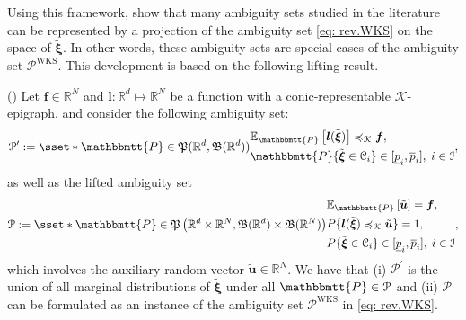 \documentclass[final,onefignum,onetabnum]{class}
\newcommand{\ee}[2]{\mathbb{E}_{#1} \left[ #2 \right]}
\newcommand{\bs}[1]{\boldsymbol{#1}} %
\newcommand{\Bs}[1]{\mathbb{#1}} %
\newcommand{\Ts}[1]{\mathbbmtt{#1}} %
\newcommand{\Cs}[1]{\mathcal{#1}} %
\newcommand{\Fs}[1]{\mathfrak{#1}} %
\newcommand{\txi}{\tilde{\bs{\xi}}}
\newcommand{\tbs}[1]{\tilde{\bs{#1}}}
\newcommand{\ul}[1]{\underline{#1}}
\newcommand{\ol}[1]{\overline{#1}}
\newcommand{\pprobset}[2]{\Fs{P}\left( \Bs{R}^{#1} \times \Bs{R}^{#2}, \Fs{B}(\Bs{R}^{#1}) \times \Fs{B}(\Bs{R}^{#2}) \right)}
\renewcommand{\P}{\Fs{P}(\Bs{R}^{d},\Fs{B}(\Bs{R}^{d}))}
\begin{document}
Using this  framework, \citet{wiesemann2014} show that many ambiguity sets studied in the literature can be represented by a projection of the  ambiguity set   \eqref{eq: rev.WKS} on the space of $\txi$. In other words, these ambiguity sets are special cases of the ambiguity set $\Cs{P}^{\text{WKS}}$. %
This development is based on the following lifting result. 
\begin{theorem}{(\citet[Theorem~5]{wiesemann2014})}
    \label{thm: rev.lifting_WKS}
    Let $\bs{f} \in \Bs{R}^{N}$ and $\bs{l}: \Bs{R}^{d} \mapsto \Bs{R}^{N}$ be a function with a conic-representable $\Cs{K}$-epigraph, and consider the following ambiguity set: 
    \begin{equation*}
	\Cs{P}^{\prime}:=\sset*{\Ts{P}\in\P}{ 
		\begin{aligned}  
			& \ee{\Ts{P}}{\bs{l}(\txi)} \preccurlyeq_{\Cs{K}}\bs{f},\\
			& \Ts{P}\{\txi  \in \Cs{C}_{i} \} \in [\ul{p}_{i}, \ol{p}_{i}], \; i \in \Cs{I}
		\end{aligned}  
	},
    \end{equation*} 
    as well as the lifted ambiguity set 
    \begin{equation*}
    	\Cs{P}:=\sset*{\Ts{P}\in \pprobset{d}{N} }{ 
    		\begin{aligned}  
    		    & \ee{\Ts{P}}{\tbs{u}}=\bs{f},\\
    			& P\{\bs{l}(\txi) \preccurlyeq_{\Cs{K}} \tbs{u} \} = 1,\\
    			& P\{\txi  \in \Cs{C}_{i} \} \in [\ul{p}_{i}, \ol{p}_{i}], \; i \in \Cs{I}
    		\end{aligned}  
    	},
    \end{equation*} 
    which involves the auxiliary random vector $\tbs{u} \in \Bs{R}^{N}$. We have that (i) $\Cs{P}^{\prime}$ is the union of  all marginal distributions of $\txi$ under all $\Ts{P} \in \Cs{P}$ and (ii) $\Cs{P}$ can be formulated as an instance of the ambiguity set $\Cs{P}^{\text{WKS}}$ in \eqref{eq: rev.WKS}. 
\end{theorem}
\end{document}
